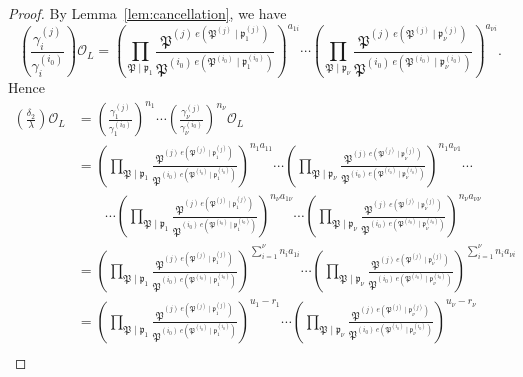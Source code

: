 \begin{proof}

By Lemma~\ref{lem:cancellation}, we have 
\[\left( \frac{\gamma_i^{(j)}}{\gamma_i^{(i_0)}}\right)\mathcal{O}_L 
	 = \left(\prod_{\mathfrak{P}\mid\mathfrak{p}_1} \frac{\mathfrak{P}^{(j) \ e(\mathfrak{P}^{(j)}\mid\mathfrak{p}_1^{(j)})}}{\mathfrak{P}^{(i_0) \ e(\mathfrak{P}^{(i_0)}\mid\mathfrak{p}^{(i_0)}_1)}}\right)^{a_{1i}} \cdots \left(\prod_{\mathfrak{P}\mid\mathfrak{p}_{\nu}} \frac{\mathfrak{P}^{(j) \ e(\mathfrak{P}^{(j)}\mid\mathfrak{p}^{(j)}_{\nu})}}{\mathfrak{P}^{(i_0) \ e(\mathfrak{P}^{(i_0)}\mid\mathfrak{p}^{(i_0)}_{\nu})}}\right)^{a_{\nu i}}.\]
Hence
\begin{align*}
\left(\frac{\delta_2}{\lambda}\right)\mathcal{O}_L
	& = \left( \frac{\gamma_1^{(j)}}{\gamma_1^{(i_0)}}\right)^{n_1}\cdots \left( \frac{\gamma_{\nu}^{(j)}}{\gamma_{\nu}^{(i_0)}}\right)^{n_{\nu}} \mathcal{O}_L\\
	& = \left(\prod_{\mathfrak{P}\mid\mathfrak{p}_1} \frac{\mathfrak{P}^{(j) \ e(\mathfrak{P}^{(j)}\mid\mathfrak{p}_1^{(j)})}}{\mathfrak{P}^{(i_0) \ e(\mathfrak{P}^{(i_0)}\mid\mathfrak{p}^{(i_0)}_1)}}\right)^{n_1a_{11}} \cdots \left(\prod_{\mathfrak{P}\mid\mathfrak{p}_{\nu}} \frac{\mathfrak{P}^{(j) \ e(\mathfrak{P}^{(j)}\mid\mathfrak{p}^{(j)}_{\nu})}}{\mathfrak{P}^{(i_0) \ e(\mathfrak{P}^{(i_0)}\mid\mathfrak{p}^{(i_0)}_{\nu})}}\right)^{n_1a_{\nu 1}} \cdots \\
	& \quad \quad \cdots 
\left(\prod_{\mathfrak{P}\mid\mathfrak{p}_1} \frac{\mathfrak{P}^{(j) \ e(\mathfrak{P}^{(j)}\mid\mathfrak{p}_1^{(j)})}}{\mathfrak{P}^{(i_0) \ e(\mathfrak{P}^{(i_0)}\mid\mathfrak{p}^{(i_0)}_1)}}\right)^{n_{\nu}a_{1\nu}} \cdots \left(\prod_{\mathfrak{P}\mid\mathfrak{p}_{\nu}} \frac{\mathfrak{P}^{(j) \ e(\mathfrak{P}^{(j)}\mid\mathfrak{p}^{(j)}_{\nu})}}{\mathfrak{P}^{(i_0) \ e(\mathfrak{P}^{(i_0)}\mid\mathfrak{p}^{(i_0)}_{\nu})}}\right)^{n_{\nu} a_{\nu \nu}} \\
	& = \left(\prod_{\mathfrak{P}\mid\mathfrak{p}_1} \frac{\mathfrak{P}^{(j) \ e(\mathfrak{P}^{(j)}\mid\mathfrak{p}_1^{(j)})}}{\mathfrak{P}^{(i_0) \ e(\mathfrak{P}^{(i_0)}\mid\mathfrak{p}^{(i_0)}_1)}}\right)^{\sum_{i = 1}^\nu n_ia_{1i}} \cdots \left(\prod_{\mathfrak{P}\mid\mathfrak{p}_{\nu}} \frac{\mathfrak{P}^{(j) \ e(\mathfrak{P}^{(j)}\mid\mathfrak{p}^{(j)}_{\nu})}}{\mathfrak{P}^{(i_0) \ e(\mathfrak{P}^{(i_0)}\mid\mathfrak{p}^{(i_0)}_{\nu})}}\right)^{\sum_{i=1}^{\nu} n_ia_{\nu i}}\\
	& = \left(\prod_{\mathfrak{P}\mid\mathfrak{p}_1} \frac{\mathfrak{P}^{(j) \ e(\mathfrak{P}^{(j)}\mid\mathfrak{p}_1^{(j)})}}{\mathfrak{P}^{(i_0) \ e(\mathfrak{P}^{(i_0)}\mid\mathfrak{p}^{(i_0)}_1)}}\right)^{u_1 - r_1} \cdots \left(\prod_{\mathfrak{P}\mid\mathfrak{p}_{\nu}} \frac{\mathfrak{P}^{(j) \ e(\mathfrak{P}^{(j)}\mid\mathfrak{p}^{(j)}_{\nu})}}{\mathfrak{P}^{(i_0) \ e(\mathfrak{P}^{(i_0)}\mid\mathfrak{p}^{(i_0)}_{\nu})}}\right)^{u_{\nu} - r_{\nu}}\\

\end{align*}
\end{proof}
